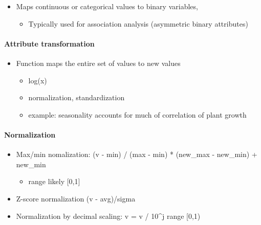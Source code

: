 \documentclass[11pt]{article}
\providecommand{\tightlist}{%
      \setlength{\itemsep}{0pt}\setlength{\parskip}{0pt}}
\begin{document}
    \begin{itemize}
\tightlist
\item
  Maps continuous or categorical values to binary variables,

  \begin{itemize}
  \tightlist
  \item
    Typically used for association analysis (asymmetric binary
    attributes)
  \end{itemize}
\end{itemize}

    \paragraph{Attribute transformation}\label{attribute-transformation}

    \begin{itemize}
\tightlist
\item
  Function maps the entire set of values to new values

  \begin{itemize}
  \tightlist
  \item
    log(x)
  \item
    normalization, standardization
  \item
    example: seasonality accounts for much of correlation of plant
    growth
  \end{itemize}
\end{itemize}

    \paragraph{Normalization}\label{normalization}

    \begin{itemize}
\tightlist
\item
  Max/min nomalization: (v - min) / (max - min) * (new\_max - new\_min)
  + new\_min

  \begin{itemize}
  \tightlist
  \item
    range likely {[}0,1{]}
  \end{itemize}
\end{itemize}

    \begin{itemize}
\tightlist
\item
  Z-score normalization (v - avg)/sigma
\end{itemize}

    \begin{itemize}
\tightlist
\item
  Normalization by decimal scaling: v = v / 10\^{}j range {[}0,1)
\end{itemize}
\end{document}
